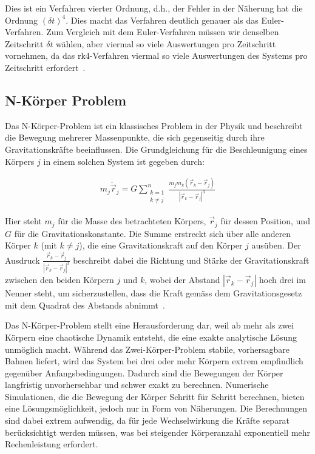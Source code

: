 \documentclass[a4paper,12pt,twoside]{article}
\begin{document}
Dies ist ein Verfahren vierter Ordnung, d.h., der Fehler in der Näherung hat die 
Ordnung $(\delta t)^4$. Dies macht das Verfahren deutlich genauer als das Euler-Verfahren. Zum Vergleich mit dem Euler-Verfahren müssen wir denselben Zeitschritt $\delta t$ wählen, aber viermal so viele Auswertungen pro Zeitschritt vornehmen, da das rk4-Verfahren viermal so viele Auswertungen des Systems pro Zeitschritt erfordert~\cite{Swarthmore2005}.

\subsection{N-Körper Problem}
Das N-Körper-Problem ist ein klassisches Problem in der Physik und beschreibt 
die Bewegung mehrerer Massenpunkte, die sich gegenseitig durch ihre Gravitationskräfte 
beeinflussen. Die Grundgleichung für die Beschleunigung eines Körpers \( j \) 
in einem solchen System ist gegeben durch:

\begin{align*}
	m_j \ddot{\vec{r}}_j = G \sum_{\substack{k=1 \\ k \neq j}}^n \frac{m_j m_k (\vec{r}_k - \vec{r}_j)}{|\vec{r}_k - \vec{r}_j|^3}
\end{align*}

Hier steht \( m_j \) für die Masse des betrachteten Körpers, \( \vec{r}_j \) für dessen 
Position, und \( G \) für die Gravitationskonstante. Die Summe erstreckt sich über alle 
anderen Körper \( k \) (mit \( k \neq j \)), die eine Gravitationskraft auf den Körper 
\( j \) ausüben. Der Ausdruck \( \frac{\vec{r}_k - \vec{r}_j}{|\vec{r}_k - \vec{r}_j|^3} \) 
beschreibt dabei die Richtung und Stärke der Gravitationskraft zwischen den beiden 
Körpern \( j \) und \( k \), wobei der Abstand \( |\vec{r}_k - \vec{r}_j| \) hoch drei 
im Nenner steht, um sicherzustellen, dass die Kraft gemäss dem Gravitationsgesetz mit 
dem Quadrat des Abstands abnimmt~\cite{Schäfer2017}.

Das N-Körper-Problem stellt eine Herausforderung dar, weil ab mehr als zwei Körpern eine 
chaotische Dynamik entsteht, die eine exakte analytische Lösung unmöglich macht. 
Während das Zwei-Körper-Problem stabile, vorhersagbare Bahnen liefert, wird das 
System bei drei oder mehr Körpern extrem empfindlich gegenüber Anfangsbedingungen.
Dadurch sind die Bewegungen der Körper langfristig unvorhersehbar und schwer exakt 
zu berechnen. Numerische Simulationen, die die Bewegung der Körper Schritt für Schritt 
berechnen, bieten eine Lösungsmöglichkeit, jedoch nur in Form von Näherungen. 
Die Berechnungen sind dabei extrem aufwendig, da für jede Wechselwirkung die Kräfte 
separat berücksichtigt werden müssen, was bei steigender Körperanzahl exponentiell 
mehr Rechenleistung erfordert.
\end{document}
